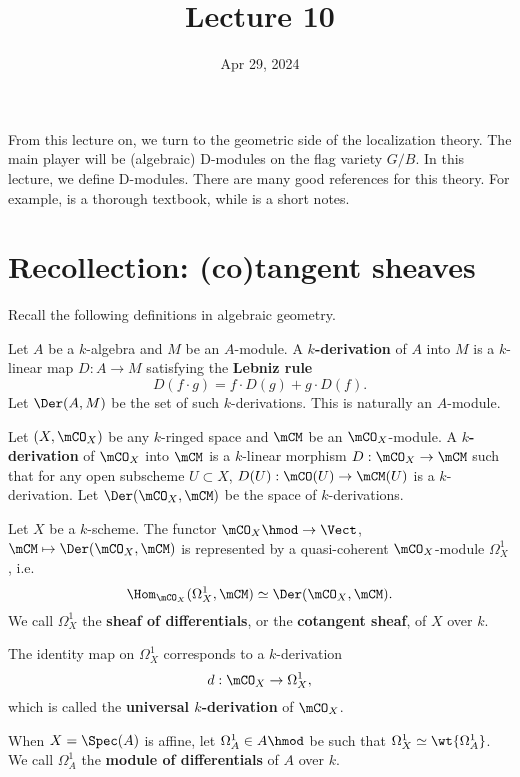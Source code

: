 





\title{Lecture 10}

\date{Apr 29, 2024}

\maketitle

	From this lecture on, we turn to the geometric side of the localization theory. The main player will be (algebraic) D-modules on the flag variety $G/B$. In this lecture, we define D-modules. There are many good references for this theory. For example, \cite{HTT} is a thorough textbook, while \cite{B} is a short notes.

\section{Recollection: (co)tangent sheaves}

	Recall the following definitions in algebraic geometry.

	\begin{defn}
		Let $A$ be a $k$-algebra and $M$ be an $A$-module. A \textbf{$k$-derivation} of $A$ into $M$ is a $k$-linear map $D:A\to M$ satisfying the \textbf{Lebniz rule}
		\[
			D(f\cdot g) = f\cdot D (g) + g\cdot D (f).
		\]
		Let $\Der(A,M)$ be the set of such $k$-derivations. This is naturally an $A$-module.
	\end{defn}

	\begin{defn}
		Let $(X,\mCO_X)$ be any $k$-ringed space and $\mCM$ be an $\mCO_X$-module. A \textbf{$k$-derivation} of $\mCO_X$ into $\mCM$ is a $k$-linear morphism $D:\mCO_X \to \mCM$ such that for any open subscheme $U\subset X$, $D(U): \mCO(U) \to \mCM(U)$ is a $k$-derivation. Let $\Der(\mCO_X,\mCM)$ be the space of $k$-derivations.
	\end{defn}

	\begin{propdefn}
		Let $X$ be a $k$-scheme. The functor $\mCO_X\hmod \to \Vect$, $\mCM \mapsto \Der(\mCO_X,\mCM)$ is represented by a quasi-coherent $\mCO_X$-module $\Omega_{X}^1$, i.e. 
		\[
			\Hom_{\mCO_X}(\Omega_{X}^1, \mCM) \simeq \Der(\mCO_X,\mCM).
		\]
		We call $\Omega_{X}^1$ the \textbf{sheaf of differentials}, or the \textbf{cotangent sheaf}, of $X$ over $k$.

		The identity map on $\Omega_{X}^1$ corresponds to a $k$-derivation 
		\[
			d:\mCO_X \to \Omega_{X}^1,
		\]
		which is called the \textbf{universal $k$-derivation} of $\mCO_X$.

		When $X=\Spec(A)$ is affine, let $\Omega_{A}^1\in A\hmod$ be such that $\Omega_{X}^1 \simeq \wt{\Omega_{A}^1}$. We call $\Omega_{A}^1$ the \textbf{module of differentials} of $A$ over $k$.
	\end{propdefn}

